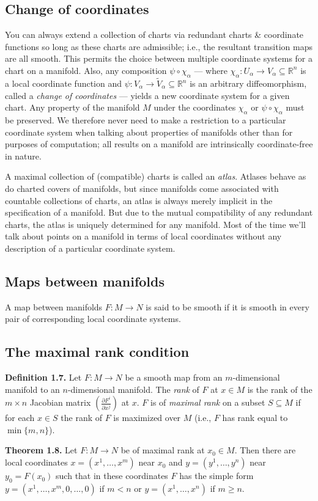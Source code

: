 \documentclass[a4paper]{article}
\newcommand{\R}{\mathbb{R}}
\begin{document}
\subsection{Change of coordinates}

You can always extend a collection of charts via redundant charts \& coordinate functions so long as these charts are admissible; i.e., the resultant transition maps are all smooth. This permits the choice between multiple coordinate systems for a chart on a manifold. Also, any composition $\psi \circ \chi_\alpha$ --- where $\chi_\alpha : U_\alpha \to V_\alpha \subseteq \R^n$ is a local coordinate function and $\psi : V_\alpha \to \tilde{V}_\alpha \subseteq \R^n$ is an arbitrary diffeomorphism, called a \emph{change of coordinates} --- yields a new coordinate system for a given chart. Any property of the manifold $M$ under the coordinates $\chi_\alpha$ or $\psi \circ \chi_\alpha$ must be preserved. We therefore never need to make a restriction to a particular coordinate system when talking about properties of manifolds other than for purposes of computation; all results on a manifold are intrinsically coordinate-free in nature.

A maximal collection of (compatible) charts is called an \emph{atlas}. Atlases behave as do charted covers of manifolds, but since manifolds come associated with countable collections of charts, an atlas is always merely implicit in the specification of a manifold. But due to the mutual compatibility of any redundant charts, the atlas is uniquely determined for any manifold. Most of the time we'll talk about points on a manifold in terms of local coordinates without any description of a particular coordinate system.

\subsection{Maps between manifolds}

A map between manifolds $F : M \to N$ is said to be smooth if it is smooth in every pair of corresponding local coordinate systems. 

\subsection{The maximal rank condition}

\textbf{Definition 1.7.} Let $F : M \to N$ be a smooth map from an $m$-dimensional manifold to an $n$-dimensional manifold. The \emph{rank} of $F$ at $x \in M$ is the rank of the $m \times n$ Jacobian matrix $\left(\frac{\partial F^i}{\partial x^j}\right)$ at $x$. $F$ is of \emph{maximal rank} on a subset $S \subseteq M$ if for each $x \in S$ the rank of $F$ is maximized over $M$ (i.e., $F$ has rank equal to $\min\{m, n\}$).

\textbf{Theorem 1.8.} Let $F : M \to N$ be of maximal rank at $x_0 \in M$. Then there are local coordinates $x = (x^1, \ldots, x^m)$ near $x_0$ and $y = (y^1, \ldots, y^n)$ near $y_0 = F(x_0)$ such that in these coordinates $F$ has the simple form $y = (x^1, \ldots, x^m, 0, \ldots, 0)$ if $m < n$ or $y = (x^1, \ldots, x^n)$ if $m \geq n$.
\end{document}
